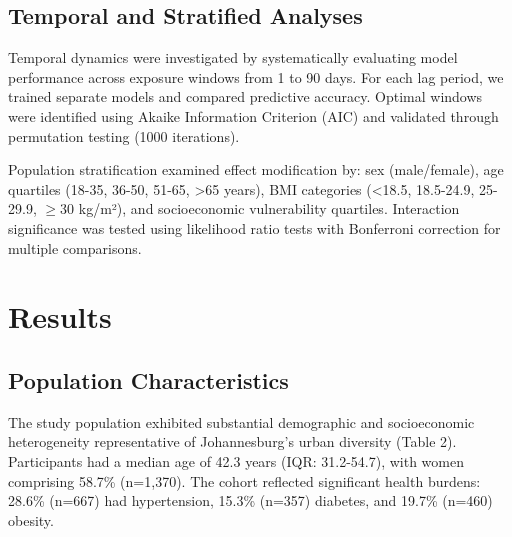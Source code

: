 \documentclass[11pt,a4paper]{article}
\begin{document}
\subsection{Temporal and Stratified Analyses}

Temporal dynamics were investigated by systematically evaluating model performance across exposure windows from 1 to 90 days. For each lag period, we trained separate models and compared predictive accuracy. Optimal windows were identified using Akaike Information Criterion (AIC) and validated through permutation testing (1000 iterations).

Population stratification examined effect modification by: sex (male/female), age quartiles (18-35, 36-50, 51-65, >65 years), BMI categories (<18.5, 18.5-24.9, 25-29.9, $\geq$30 kg/m²), and socioeconomic vulnerability quartiles. Interaction significance was tested using likelihood ratio tests with Bonferroni correction for multiple comparisons.

\section{Results}

\subsection{Population Characteristics}

The study population exhibited substantial demographic and socioeconomic heterogeneity representative of Johannesburg's urban diversity (Table 2). Participants had a median age of 42.3 years (IQR: 31.2-54.7), with women comprising 58.7\% (n=1,370). The cohort reflected significant health burdens: 28.6\% (n=667) had hypertension, 15.3\% (n=357) diabetes, and 19.7\% (n=460) obesity.
\end{document}
